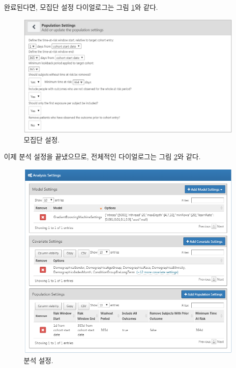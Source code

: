 \documentclass[11pt]{book}
\theoremstyle{definition}
\theoremstyle{definition}
\theoremstyle{definition}
\theoremstyle{remark}
\begin{document}
완료된다면, 모집단 설정 다이얼로그는 그림 \ref{fig:populationSettings}와
같다.

\begin{figure}

{\centering \includegraphics[width=1\linewidth]{images/PatientLevelPrediction/populationSettings} 

}

\caption{모집단 설정.}\label{fig:populationSettings}
\end{figure}

이제 분석 설정을 끝냈으므로, 전체적인 다이얼로그는 그림
\ref{fig:analysisSettings}와 같다.

\begin{figure}

{\centering \includegraphics[width=1\linewidth]{images/PatientLevelPrediction/analysisSettings} 

}

\caption{분석 설정.}\label{fig:analysisSettings}
\end{figure}
\end{document}
